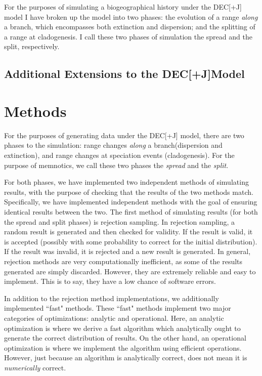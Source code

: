 \documentclass{article}
\newcommand{\decj}{DEC[+J]}
\begin{document}
For the purposes of simulating a biogeographical history under the \decj{}
model I have broken up the model into two phases: the evolution of a range
\textit{along} a branch, which encompasses both extinction and dispersion; and
the splitting of a range at cladogenesis.
I call these two phases of simulation the spread and the split, respectively.

\subsection{Additional Extensions to the \decj Model}

\section{Methods}

For the purposes of generating data under the DEC[+J] model, there are two
phases to the simulation: range changes \textit{along} a branch(dispersion and
extinction), and range changes at speciation events (cladogenesis).
For the purpose of memnotics, we call these two phases the \textit{spread} and
the \textit{split}.

For both phases, we have implemented two independent methods of simulating
results, with the purpose of checking that the results of the two methods match.
Specifically, we have implemented independent methods with the goal of ensuring
identical results between the two.
The first method of simulating results (for both the spread and split phases) is
rejection sampling.
In rejection sampling, a random result is generated and then checked for
validity.
If the result is valid, it is accepted (possibly with some probability to
correct for the initial distribution).
If the result was invalid, it is rejected and a new result is generated.
In general, rejection methods are very computationally inefficient, as some of
the results generated are simply discarded. 
However, they are extremely reliable and easy to implement.
This is to say, they have a low chance of software errors.

In addition to the rejection method implementations, we additionally implemented 
``fast" methods.
These ``fast" methods implement two major categories of optimizations: analytic
and operational.
Here, an analytic optimization is where we derive a fast algorithm which
analytically ought to generate the correct distribution of results.
On the other hand, an operational optimization is where we implement the
algorithm using efficient operations.
However, just because an algorithm is analytically correct, does not mean it is
\textit{numerically} correct\cite{goldberg_what_1991, noauthor_ieee_1985}.
\end{document}
